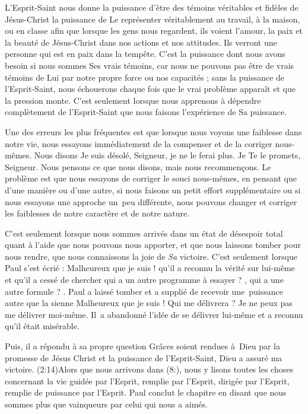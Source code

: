 L'Esprit-Saint nous donne la puissance d'être des témoins véritables
 et fidèles de Jésus-Christ \ocadr la puissance de Le représenter
 véritablement au travail, à la maison, ou en classe \fcadr{}
 afin que lorsque les gens nous regardent, ils voient l'amour,
 la paix et la beauté de Jésus-Christ dans nos actions et nos attitudes.
 Ils verront une personne qui est en paix dans la tempête.
 C'est la puissance dont nous avons besoin si nous sommes Ses vrais témoins,
 car nous ne pouvons pas être de vrais témoins de Lui par notre propre force
 ou nos capacités ; sans la puissance de l'Esprit-Saint, nous échouerons
 chaque fois que le vrai problème apparaît et que la pression monte.
 C'est seulement lorsque nous apprenons à dépendre complètement
 de l'Esprit-Saint que nous faisons l'expérience de Sa puissance.

Une des erreurs les plus fréquentes est que lorsque nous voyons une
 faiblesse dans notre vie, nous essayons immédiatement de la compenser
 et de la corriger nous-mêmes. Nous disons\frcolon{}
 \Og Je suis désolé, Seigneur, je ne le ferai plus.
 Je Te le promets, Seigneur. \Fg{}
 Nous pensons ce que nous disons, mais nous recommençons.
 Le problème est que nous essayons de corriger le souci nous-mêmes,
 en pensant que d'une manière ou d'une autre, si nous faisons un petit effort
 supplémentaire ou si nous essayons une approche un~peu différente,
 nous pouvons changer et corriger les faiblesses de notre caractère
 et de notre nature.

C'est seulement lorsque nous sommes arrivés dans un état de désespoir total
 quant à l'aide que nous pouvons nous apporter, et que nous laissons
 tomber pour nous rendre, que nous connaissons la joie de \emph{Sa} victoire.
 C'est seulement lorsque Paul s'est écrié :
 \Og Malheureux que je suis ! \Fg{} qu'il a reconnu la vérité sur lui-même
 et qu'il a cessé de chercher \Og qui a un autre programme à essayer ? \Fg{},
 \Og qui a une autre formule ? \Fg{}.
 Paul a laissé tomber et a supplié de recevoir une~puissance
 autre que la sienne\frcolon{} \Og Malheureux que je suis ! Qui me délivrera ?
 Je ne peux pas me délivrer moi-même. \Fg{}
 Il~a abandonné l'idée de se délivrer lui-même et a reconnu
 qu'il était misérable.

Puis, il a répondu à sa propre question\frcolon{}
 \Og Grâces soient rendues à~Dieu par la promesse de Jésus Christ
 et la puissance de l'Esprit-Saint, Dieu a assuré ma victoire. \Fg{}
 (2:14)Alors que nous arrivons dans (8:),
 nous y lisons toutes les choses concernant la vie guidée par l'Esprit,
 remplie par l'Esprit, dirigée par l'Esprit, remplie de puissance par l'Esprit.
 Paul conclut le chapitre en disant que nous sommes \Og plus que vainqueurs
 par celui qui nous a aimés. \Fg{}

